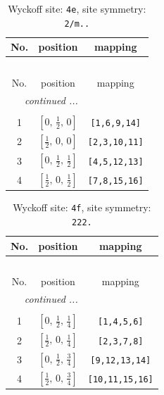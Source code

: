 \documentclass[fleqn,8pt]{jsarticle}
\begin{document}
\begin{longtable}{ccc}
\caption{Wyckoff site: {\tt 4e}, site symmetry: {\tt 2/m..}}
 \\
 \hline \hline
No. & position & mapping \\ \hline \endfirsthead

\multicolumn{2}{l}{\tablename\ \thetable{}} \\
 \hline \hline
No. & position & mapping \\ \hline \endhead

 \hline \hline
\multicolumn{2}{r}{\footnotesize\it continued ...} \\ \endfoot

 \hline \hline
\multicolumn{2}{r}{} \\ \endlastfoot

1 & $\left[ 0,\, \frac{1}{2},\, 0 \right]$ & {\tt [1,6,9,14]} \\ \hline
2 & $\left[ \frac{1}{2},\, 0,\, 0 \right]$ & {\tt [2,3,10,11]} \\ \hline
3 & $\left[ 0,\, \frac{1}{2},\, \frac{1}{2} \right]$ & {\tt [4,5,12,13]} \\ \hline
4 & $\left[ \frac{1}{2},\, 0,\, \frac{1}{2} \right]$ & {\tt [7,8,15,16]} \\
\end{longtable}
\renewcommand{\arraystretch}{1.2}
\begin{longtable}{ccc}
\caption{Wyckoff site: {\tt 4f}, site symmetry: {\tt 222.}}
 \\
 \hline \hline
No. & position & mapping \\ \hline \endfirsthead

\multicolumn{2}{l}{\tablename\ \thetable{}} \\
 \hline \hline
No. & position & mapping \\ \hline \endhead

 \hline \hline
\multicolumn{2}{r}{\footnotesize\it continued ...} \\ \endfoot

 \hline \hline
\multicolumn{2}{r}{} \\ \endlastfoot

1 & $\left[ 0,\, \frac{1}{2},\, \frac{1}{4} \right]$ & {\tt [1,4,5,6]} \\ \hline
2 & $\left[ \frac{1}{2},\, 0,\, \frac{1}{4} \right]$ & {\tt [2,3,7,8]} \\ \hline
3 & $\left[ 0,\, \frac{1}{2},\, \frac{3}{4} \right]$ & {\tt [9,12,13,14]} \\ \hline
4 & $\left[ \frac{1}{2},\, 0,\, \frac{3}{4} \right]$ & {\tt [10,11,15,16]} \\
\end{longtable}
\end{document}
